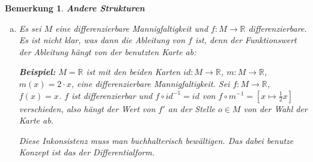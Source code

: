 \documentclass[12pt]{scrbook}   %
\newtheorem{bemX}[alles]{Bemerkung}
\newenvironment{bem}[1]{\begin{bemX}{\bf #1}\par\rm}{\end{bemX}}
\newcommand{\da}{\coloneqq}
\begin{document}
\begin{bem}{Andere Strukturen}
\begin{enumerate}[a)]
Sei nun $M$ eine differenzierbare Mannigfaltigkeit, $\gamma:[0,1]\to M$ ein Weg. $\gamma$ hießt differenzierbar in $t\in (0,1)$, falls es ein $\varepsilon>0$ gibt mit $\gamma(t-\varepsilon, t+\varepsilon)\subseteq U$, $U$ eine Kartenumgebung von $\gamma(t)$, so dass $\varphi_U\circ\gamma|_{(t-\varepsilon, t+\varepsilon)}:(t-\varepsilon,t+\varepsilon) \to Z(U)\subseteq \mathbb R^n$ in $t$ differenzierbar ist. Das ist unabhängig von der gewählten Umgebung von $\gamma(t)$.

Was ist nun die Länge der Kurve $\gamma$? Wähle dazu $0=t_0< t_1<\cdots t_n=1$, so dass $\gamma([t_1,t_{i+1}])\subseteq U_i$ wobei $(U_i,\varphi_{U_i})$ zum Atlas gehört. Ein Ansatz für die Länge der Kurve ist
\[
L(\gamma) = \sum_{i=1}^n L(\varphi_{U_i} \circ \gamma|_{[t_{i-1},t-i]})\,.
\]
Ist dies abhängig von der gewähnten Zerlegung in $t_i$? Als Ausweg fordern wir, dass der Atlas Riemann’sch ist, also alle Kartenwechsel $\psi_{U,V} : \varphi_U(U\cap V) \to \varphi_V(U\cap V)$ längenerhaltend sind ($\forall x\in \varphi_U(U\cap V): D\psi_{U,V}(X)\in O(n)$). Wenn der Atlas Riemann’sch ist, dann hängt die Länge $L(\gamma)$ nicht von den $t_i$ und $U_i$ ab (was hier nicht bewiesen werden soll).

Wenn dann die Mannigfaltigkeit zusammenhängend ist, ist sie wegzusammenhängend und zwischen je zwei Punkten gibt es stückweise differenzierbare Wege. Durch $d(p,q) \da \inf_{\gamma\in\Omega_{pq}}(L(\gamma))$ mit $\Omega_{pq}\da\{\gamma:[0,1]\to M$, $\gamma(0)=p$, $\gamma(1)=q$ und $\gamma$ stückweise stetig differenzierbar$\}$ definiert eine Metrik auf $M$. Damit versehen nennt man $M$ eine Riemann'sche\footnote{Bernhard Riemann, 1826-1866}
Mannigfaltigkeit. Dies ist der Hauptgegenstand der Riemann'schen Geometrie

\item Es sei $M$ eine differenzierbare Mannigfaltigkeit und $f:M\to \mathbb R$ differenzierbare. Es ist nicht klar, was dann die Ableitung von $f$ ist, denn der Funktionswert der Ableitung 
h\"angt von der benutzten Karte ab:

{\bf Beispiel:} $M=\mathbb R$ ist mit den beiden Karten $id:M \to \mathbb R$, $m:M\to \mathbb R$, $m(x)=2\cdot x$, eine differenzierbare Mannigfaltigkeit. Sei $f:M\to \mathbb R$, $f(x)=x$. $f$ ist differenzierbar und $f\circ id^{-1} = id$ von $f\circ m^{-1}=[x\mapsto \frac12 x]$ verschieden, also hängt der Wert von $f'$ an der Stelle $o\in M$ von der Wahl der Karte ab.

Diese Inkonsistenz muss man buchhalterisch bewältigen. Das dabei benutze Konzept ist das der Differentialform.
\end{enumerate}
\end{bem}
\end{document}
